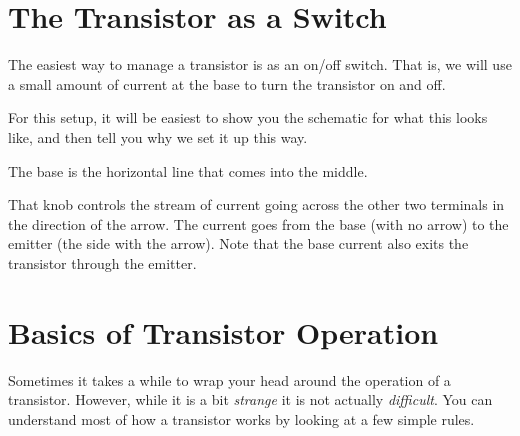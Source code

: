\section{The Transistor as a Switch}

The easiest way to manage a transistor is as an on/off switch.
That is, we will use a small amount of current at the base to turn the transistor on and off.

For this setup, it will be easiest to show you the schematic for what this looks like, and then tell you why we set it up this way.



The base is the horizontal line that comes into the middle.  


That knob controls the stream of current going across the other two terminals in the direction of the arrow.
The current goes from the base (with no arrow) to the emitter (the side with the arrow).
Note that the base current also exits the transistor through the emitter.

\section{Basics of Transistor Operation}

Sometimes it takes a while to wrap your head around the operation of a transistor.
However, while it is a bit \emph{strange} it is not actually \emph{difficult}.
You can understand most of how a transistor works by looking at a few simple rules.

